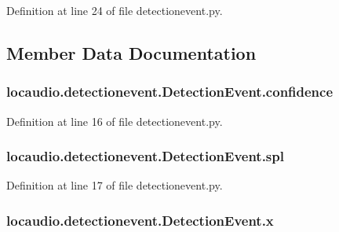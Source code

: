 Definition at line 24 of file detectionevent.\-py.



\subsection{Member Data Documentation}
\hypertarget{classlocaudio_1_1detectionevent_1_1DetectionEvent_af0b955e105202f670cee964ce52d911f}{
\subsubsection[{confidence}]{\setlength{\rightskip}{0pt plus 5cm}locaudio.\-detectionevent.\-Detection\-Event.\-confidence}}\label{classlocaudio_1_1detectionevent_1_1DetectionEvent_af0b955e105202f670cee964ce52d911f}


Definition at line 16 of file detectionevent.\-py.

\hypertarget{classlocaudio_1_1detectionevent_1_1DetectionEvent_aba6f9b944aea803742ef4aed6e34f215}{
\subsubsection[{spl}]{\setlength{\rightskip}{0pt plus 5cm}locaudio.\-detectionevent.\-Detection\-Event.\-spl}}\label{classlocaudio_1_1detectionevent_1_1DetectionEvent_aba6f9b944aea803742ef4aed6e34f215}


Definition at line 17 of file detectionevent.\-py.

\hypertarget{classlocaudio_1_1detectionevent_1_1DetectionEvent_ae36950069a6f55e1f6e0251dbe80b0d4}{
\subsubsection[{x}]{\setlength{\rightskip}{0pt plus 5cm}locaudio.\-detectionevent.\-Detection\-Event.\-x}}\label{classlocaudio_1_1detectionevent_1_1DetectionEvent_ae36950069a6f55e1f6e0251dbe80b0d4}


